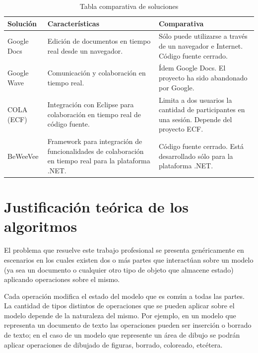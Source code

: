 \documentclass[12pt,a4paper]{article}
\let\stdsection\section
\renewcommand\section{\newpage\stdsection}
\begin{document}
\begin{table}[ht]
    \begin{tabular}{ | p{2.5cm} | p{5cm} | p{5cm} | }
    \hline
    Solución & Características & Comparativa \\ \hline

    Google Docs \cite{googledocs}& Edición de documentos en tiempo real desde un navegador. &
    Sólo puede utilizarse a través de un navegador e Internet. Código fuente cerrado. \\ \hline

    Google Wave \cite{googlewave} & Comunicación y colaboración en tiempo real. &
    Ídem Google Docs. El proyecto ha sido abandonado por Google. \\ \hline

    COLA \cite{cola} (ECF) & Integración con Eclipse para colaboración en tiempo real de código fuente. &
	Limita a dos usuarios la cantidad de participantes en una sesión. Depende del proyecto ECF. \\ \hline

    BeWeeVee \cite{beweevee} & Framework para integración de funcionalidades de colaboración en tiempo real para
    la plataforma .NET. & Código fuente cerrado. Está desarrollado sólo para la plataforma .NET. \\ \hline

    \end{tabular}
    \caption{\label{soluciones_comparacion} Tabla comparativa de soluciones}
\end{table}

	\section{Justificación teórica de los algoritmos}
	
	El problema que resuelve este trabajo profesional se presenta genéricamente en escenarios en los cuales 
	existen dos o más partes que interactúan sobre un modelo (ya sea un documento o cualquier otro tipo de 
	objeto que almacene estado) aplicando operaciones sobre el mismo.
	
	Cada operación modifica el estado del modelo que es común a todas las partes. La cantidad de tipos distintos
	de operaciones que se pueden aplicar sobre el modelo depende de la naturaleza del mismo. Por ejemplo, en un
	modelo que representa un documento de texto las operaciones pueden ser inserción o borrado de texto; en el caso
	de un modelo que represente un área de dibujo se podrán aplicar operaciones de dibujado de figuras, 
	borrado, coloreado, etcétera.
	
\end{document}
